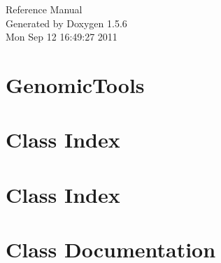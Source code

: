 \documentclass[a4paper]{book}
\begin{document}
\begin{titlepage}
\vspace*{7cm}
\begin{center}
{\Large Reference Manual}\\
\vspace*{1cm}
{\large Generated by Doxygen 1.5.6}\\
\vspace*{0.5cm}
{\small Mon Sep 12 16:49:27 2011}\\
\end{center}
\end{titlepage}
\clearemptydoublepage
{}
\tableofcontents
\clearemptydoublepage
{}
\chapter{GenomicTools}
\label{index}\hypertarget{index}{}
\chapter{Class Index}

\chapter{Class Index}

\chapter{Class Documentation}
















\printindex
\end{document}
